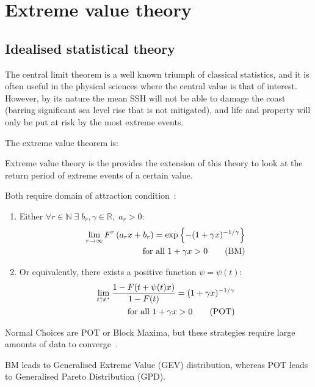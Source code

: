 \section{Extreme value theory}
\label{sec:evt}
\subsection{Idealised statistical theory}
The central limit theorem is a well known triumph of classical statistics,
and it is often useful in the physical sciences where the central value
is that of interest. However, by its nature the mean SSH will
not be able to damage the coast (barring significant sea level rise that is not mitigated),
and life and property will only be put
at risk by the most extreme events.

The extreme value theorem is:



Extreme value theory is the provides the extension of this theory
to look at the return period of extreme events of a certain value.

Both require domain of attraction condition~\cite{bucher2018horse}:

\begin{enumerate}
  \item Either $\forall r \in \mathbb{N} \;\exists \;b_r, \gamma\in \mathbb{R},\; a_r>0: $
    \begin{eqnarray}
    \lim _{r \rightarrow \infty} F^{r}\left(a_{r} x+b_{r}\right)=\exp \left\{-(1+\gamma x)^{-1 / \gamma}\right\} \notag \\
     \text { for all } 1+\gamma x>0
    \tag{BM}
    \end{eqnarray}

  \item Or equivalently, there exists a positive function $\psi=\psi (t):$
    \begin{eqnarray}
    \lim _{t \uparrow x^{*}} \frac{1-F(t+\psi(t) x)}{1-F(t)}=(1+\gamma x)^{-1 / \gamma} \notag \\
    \text { for all } 1+\gamma x>0
    \tag{POT}
    \end{eqnarray}
 \end{enumerate}

Normal Choices are POT or Block Maxima, but these strategies require
large amounts of data to converge~\cite{taleb2019much}.

BM leads to Generalised Extreme Value (GEV) distribution,
      whereas POT leads to Generalised Pareto Distribution (GPD).

